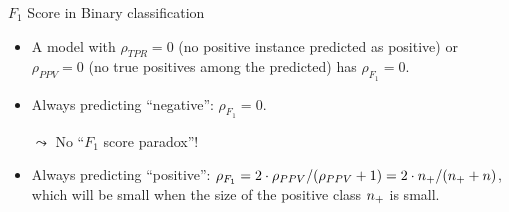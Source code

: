 \begin{vbframe}{$F_1$ Score in Binary classification}
	\begin{itemize}
		\item A model with $\rho_{TPR} = 0$ (no positive instance predicted as 
		positive) or 
		$\rho_{PPV} = 0$ (no true positives among the predicted) has $\rho_{F_1} = 0$.
		\item Always predicting \enquote{negative}: $\rho_{F_1} = 0$.
		\item [$\leadsto$] No ``$F_1$ score paradox''!
		\item Always predicting \enquote{positive}: $\rho_{F_1} = 2 \cdot \rho_{PPV} / 
		(\rho_{PPV} + 1) = 2 \cdot n_{+} / (n_{+} + n)$,\\ 
		which will be small when the size of the positive class $n_{+}$ is small.
	\end{itemize}
	
\end{vbframe}



